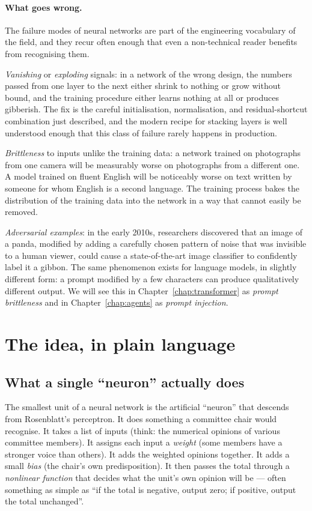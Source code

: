 \paragraph{What goes wrong.} The failure modes of neural networks are part of the
engineering vocabulary of the field, and they recur often
enough that even a non-technical reader benefits from
recognising them.

\emph{Vanishing} or \emph{exploding} signals: in a network of
the wrong design, the numbers passed from one layer to the next
either shrink to nothing or grow without bound, and the
training procedure either learns nothing at all or produces
gibberish. The fix is the careful initialisation, normalisation,
and residual-shortcut combination just described, and the
modern recipe for stacking layers is well understood enough
that this class of failure rarely happens in production.

\emph{Brittleness} to inputs unlike the training data: a network
trained on photographs from one camera will be measurably
worse on photographs from a different one. A model trained on
fluent English will be noticeably worse on text written by
someone for whom English is a second language. The training
process bakes the distribution of the training data into the
network in a way that cannot easily be removed.

\emph{Adversarial examples}: in the early 2010s, researchers
discovered that an image of a panda, modified by adding a
carefully chosen pattern of noise that was invisible to a
human viewer, could cause a state-of-the-art image classifier
to confidently label it a gibbon. The same phenomenon exists
for language models, in slightly different form: a prompt
modified by a few characters can produce qualitatively
different output. We will see this in Chapter~\ref{chap:transformer} as
\emph{prompt brittleness} and in Chapter~\ref{chap:agents} as
\emph{prompt injection}.

\section{The idea, in plain language}

\subsection*{What a single ``neuron'' actually does}

The smallest unit of a neural network is the artificial
``neuron'' that descends from Rosenblatt's perceptron. It does
something a committee chair would recognise. It takes a list of
inputs (think: the numerical opinions of various committee
members). It assigns each input a \emph{weight} (some members
have a stronger voice than others). It adds the weighted
opinions together. It adds a small \emph{bias} (the chair's
own predisposition). It then passes the total through a
\emph{nonlinear function} that decides what the unit's own
opinion will be --- often something as simple as ``if the total
is negative, output zero; if positive, output the total
unchanged''.

